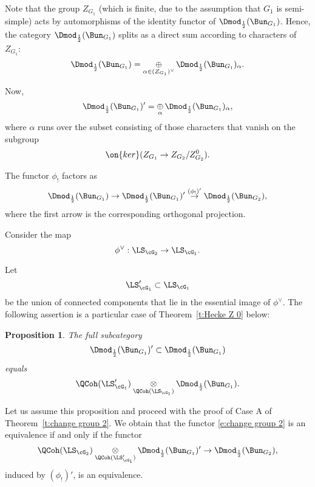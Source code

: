 \documentclass[9pt]{amsart}
\newtheorem{prop}[subsubsection]{Proposition}
\theoremstyle{remark}
\theoremstyle{definition}
\theoremstyle{remark}
\newcommand{\thmref}[1]{Theorem~\ref{#1}}
\numberwithin{equation}{section}
\begin{document}
\medskip

Note that the group $Z_{G_1}$ (which is finite, due to the assumption that $G_1$ is semi-simple) 
acts by automorphisms of the identity functor of $\Dmod_{\frac{1}{2}}(\Bun_{G_1})$. Hence,
the category $\Dmod_{\frac{1}{2}}(\Bun_{G_1})$ splits as a direct sum according to characters of $Z_{G_1}$: 
$$\Dmod_{\frac{1}{2}}(\Bun_{G_1})=\underset{\alpha\in (Z_{G_1})^\vee}\oplus\, \Dmod_{\frac{1}{2}}(\Bun_{G_1})_\alpha.$$

\medskip

Now, 
$$\Dmod_{\frac{1}{2}}(\Bun_{G_1})'= \underset{\alpha}\oplus\, \Dmod_{\frac{1}{2}}(\Bun_{G_1})_\alpha,$$
where $\alpha$ runs over the subset consisting of those characters that vanish on the subgroup
$$\on{ker}(Z_{G_1}\to Z_{G_2}/Z^0_{G_2}).$$

\medskip

The functor $\phi_!$ factors as 
$$\Dmod_{\frac{1}{2}}(\Bun_{G_1})\to  \Dmod_{\frac{1}{2}}(\Bun_{G_1})' \overset{(\phi_!)'}\to \Dmod_{\frac{1}{2}}(\Bun_{G_2}),$$
where the first arrow is the corresponding orthogonal projection. 

\sssec{}

Consider the map
$$\phi^\vee:\LS_{\cG_2}\to \LS_{\cG_1}.$$

Let 
\begin{equation} \label{e:im LS}
\LS'_{\cG_1}\subset \LS_{\cG_1}
\end{equation}
be the union of connected components that lie in the essential image of $\phi^\vee$. The following assertion is a particular case 
of \thmref{t:Hecke Z 0} below: 

\begin{prop} \label{p:neutral}
The full subcategory
$$\Dmod_{\frac{1}{2}}(\Bun_{G_1})' \subset \Dmod_{\frac{1}{2}}(\Bun_{G_1})$$
equals
$$\QCoh(\LS'_{\cG_1})\underset{\QCoh(\LS_{\cG_1})}\otimes \Dmod_{\frac{1}{2}}(\Bun_{G_1}).$$
\end{prop}

Let us assume this proposition and proceed with the proof of Case A of \thmref{t:change group 2}. We obtain that the functor 
\eqref{e:change group 2} is an equivalence if and only if the functor
\begin{equation} \label{e:change group 2'}
\QCoh(\LS_{\cG_2})\underset{\QCoh(\LS'_{\cG_1})}\otimes  \Dmod_{\frac{1}{2}}(\Bun_{G_1})'  \to \Dmod_{\frac{1}{2}}(\Bun_{G_2}),
\end{equation}
induced by $(\phi_!)'$, is an equivalence. 
\end{document}
